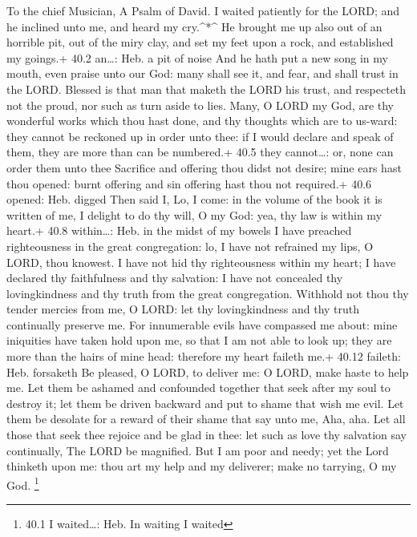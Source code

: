 To the chief Musician, A Psalm of David.  I waited patiently
for the LORD; and he inclined unto me, and heard my cry.\^{}*\^{}
 He brought me up also out of an horrible pit, out of the
miry clay, and set my feet upon a rock, and established my goings.+ 40.2
an\ldots: Heb. a pit of noise  And he hath put a new song in
my mouth, even praise unto our God: many shall see it, and fear, and
shall trust in the LORD.  Blessed is that man that maketh
the LORD his trust, and respecteth not the proud, nor such as turn aside
to lies.  Many, O LORD my God, are thy wonderful works which
thou hast done, and thy thoughts which are to us-ward: they cannot be
reckoned up in order unto thee: if I would declare and speak of them,
they are more than can be numbered.+ 40.5 they cannot\ldots: or, none
can order them unto thee  Sacrifice and offering thou didst
not desire; mine ears hast thou opened: burnt offering and sin offering
hast thou not required.+ 40.6 opened: Heb. digged  Then said
I, Lo, I come: in the volume of the book it is written of me,
 I delight to do thy will, O my God: yea, thy law is within
my heart.+ 40.8 within\ldots: Heb. in the midst of my bowels
 I have preached righteousness in the great congregation:
lo, I have not refrained my lips, O LORD, thou knowest.  I
have not hid thy righteousness within my heart; I have declared thy
faithfulness and thy salvation: I have not concealed thy lovingkindness
and thy truth from the great congregation.  Withhold not
thou thy tender mercies from me, O LORD: let thy lovingkindness and thy
truth continually preserve me.  For innumerable evils have
compassed me about: mine iniquities have taken hold upon me, so that I
am not able to look up; they are more than the hairs of mine head:
therefore my heart faileth me.+ 40.12 faileth: Heb. forsaketh
 Be pleased, O LORD, to deliver me: O LORD, make haste to
help me.  Let them be ashamed and confounded together that
seek after my soul to destroy it; let them be driven backward and put to
shame that wish me evil.  Let them be desolate for a reward
of their shame that say unto me, Aha, aha.  Let all those
that seek thee rejoice and be glad in thee: let such as love thy
salvation say continually, The LORD be magnified.  But I am
poor and needy; yet the Lord thinketh upon me: thou art my help and my
deliverer; make no tarrying, O my God. \footnote{40.1 I waited\ldots:
  Heb. In waiting I waited}

